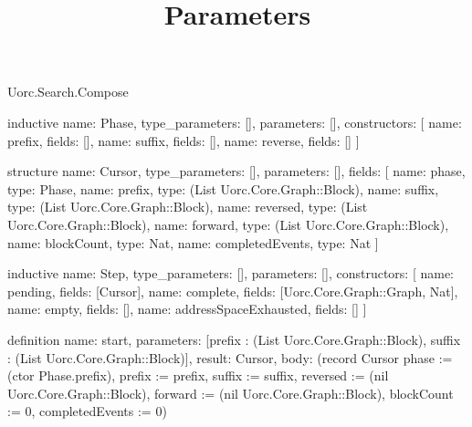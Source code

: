 \begin{lexlean}{Uorc.Search.Compose}
\title{Parameters}
\begin{semanticmodule}
inductive{
  name: Phase,
  type_parameters: [],
  parameters: [],
  constructors: [
    {name: prefix, fields: []},
    {name: suffix, fields: []},
    {name: reverse, fields: []}
  ]
}

structure{
  name: Cursor,
  type_parameters: [],
  parameters: [],
  fields: [
    {name: phase, type: Phase},
    {name: prefix, type: (List Uorc.Core.Graph::Block)},
    {name: suffix, type: (List Uorc.Core.Graph::Block)},
    {name: reversed, type: (List Uorc.Core.Graph::Block)},
    {name: forward, type: (List Uorc.Core.Graph::Block)},
    {name: blockCount, type: Nat},
    {name: completedEvents, type: Nat}
  ]
}

inductive{
  name: Step,
  type_parameters: [],
  parameters: [],
  constructors: [
    {name: pending, fields: [Cursor]},
    {name: complete, fields: [Uorc.Core.Graph::Graph, Nat]},
    {name: empty, fields: []},
    {name: addressSpaceExhausted, fields: []}
  ]
}

definition{
  name: start,
  parameters: [prefix : (List Uorc.Core.Graph::Block), suffix : (List Uorc.Core.Graph::Block)],
  result: Cursor,
  body: (record Cursor {phase := (ctor Phase.prefix), prefix := prefix, suffix := suffix, reversed := (nil Uorc.Core.Graph::Block), forward := (nil Uorc.Core.Graph::Block), blockCount := 0, completedEvents := 0})
}


\end{semanticmodule}
\end{lexlean}
